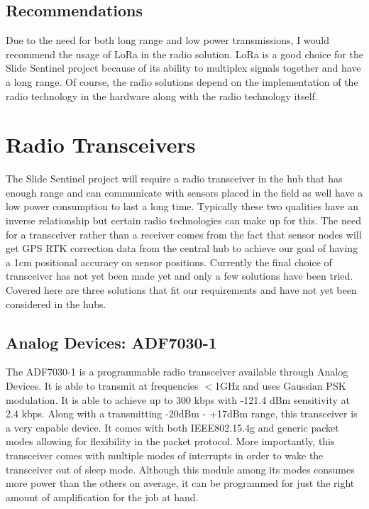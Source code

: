 \documentclass[draftclsnofoot,onecolumn, 10pt, compsoc]{IEEEtran}
\begin{document}
	\subsection{Recommendations}
	Due to the need for both long range and low power transmissions, I would recommend the usage of LoRa in the radio solution. LoRa is a good choice for the Slide Sentinel project because of its ability to multiplex signals together and have a long range. Of course, the radio solutions depend on the implementation of the radio technology in the hardware along with the radio technology itself.

	
	\section{Radio Transceivers}
	The Slide Sentinel project will require a radio transceiver in the hub that has enough range and can communicate with sensors placed in the field as well have a low power consumption to last a long time. Typically these two qualities have an inverse relationship but certain radio technologies can make up for this. The need for a transceiver rather than a receiver comes from the fact that sensor nodes will get GPS RTK correction data from the central hub to achieve our goal of having a 1cm positional accuracy on sensor positions. Currently the final choice of transceiver has not yet been made yet and only a few solutions have been tried. Covered here are three solutions that fit our requirements and have not yet been considered in the hubs.
	
	\subsection{Analog Devices: ADF7030-1}
	The ADF7030-1 is a programmable radio transceiver available through Analog Devices. It is able to transmit at frequencies $<$1GHz and uses Gaussian PSK modulation. It is able to achieve up to 300 kbps with -121.4 dBm sensitivity at 2.4 kbps. Along with a transmitting -20dBm - +17dBm range, this transceiver is a very capable device. It comes with both IEEE802.15.4g and generic packet modes allowing for flexibility in the packet protocol. More importantly, this transceiver comes with multiple modes of interrupts in order to wake the transceiver out of sleep mode. Although this module among its modes consumes more power than the others on average, it can be programmed for just the right amount of amplification for the job at hand.
\end{document}
